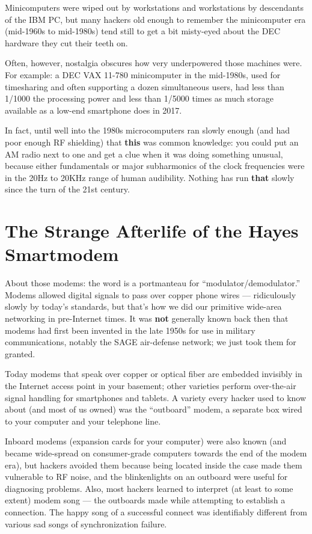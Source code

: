 \documentclass[10pt]{article}
\newcommand{\mc}{\small}
\newcommand{\acro}[1]{{\mc #1\spacefactor1000}}
\begin{document}
Minicomputers were wiped out by workstations and workstations by descendants of
the \acro{IBM PC}, but many hackers old enough to remember the minicomputer era
(mid-1960s to mid-1980s) tend still to get a bit misty-eyed about the \acro{DEC}
hardware they cut their teeth on.

Often, however, nostalgia obscures how very underpowered those machines were.
For example: a \acro{DEC VAX 11-780} minicomputer in the mid-1980s, used for
timesharing and often supporting a dozen simultaneous users, had less than
1/1000 the processing power and less than 1/5000 times as much storage
available as a low-end smartphone does in 2017.

In fact, until well into the 1980s microcomputers ran slowly enough (and had
poor enough \acro{RF} shielding) that \textbf{this} was common knowledge: you
could put an \acro{AM} radio next to one and get a clue when it was doing
something unusual, because either fundamentals or major subharmonics of the
clock frequencies were in the 20Hz to 20KHz range of human audibility. Nothing
has run \textbf{that} slowly since the turn of the 21st century.

\section{The Strange Afterlife of the Hayes Smartmodem}
About those modems: the word is a portmanteau for ``modulator/demodulator.''
Modems allowed digital signals to pass over copper phone wires --- ridiculously
slowly by today's standards, but that's how we did our primitive wide-area
networking in pre-Internet times. It was \textbf{not} generally known back then that
modems had first been invented in the late 1950s for use in military
communications, notably the \acro{SAGE} air-defense network; we just took them for
granted.

Today modems that speak over copper or optical fiber are embedded invisibly in
the Internet access point in your basement; other varieties perform
over-the-air signal handling for smartphones and tablets. A variety every
hacker used to know about (and most of us owned) was the ``outboard'' modem, a
separate box wired to your computer and your telephone line.

Inboard modems (expansion cards for your computer) were also known (and became
wide-spread on consumer-grade computers towards the end of the modem era), but
hackers avoided them because being located inside the case made them vulnerable
to \acro{RF} noise, and the blinkenlights on an outboard were useful for diagnosing
problems. Also, most hackers learned to interpret (at least to some extent)
modem song --- the outboards made while attempting to establish a connection. The
happy song of a successful connect was identifiably different from various sad
songs of synchronization failure.
\end{document}
